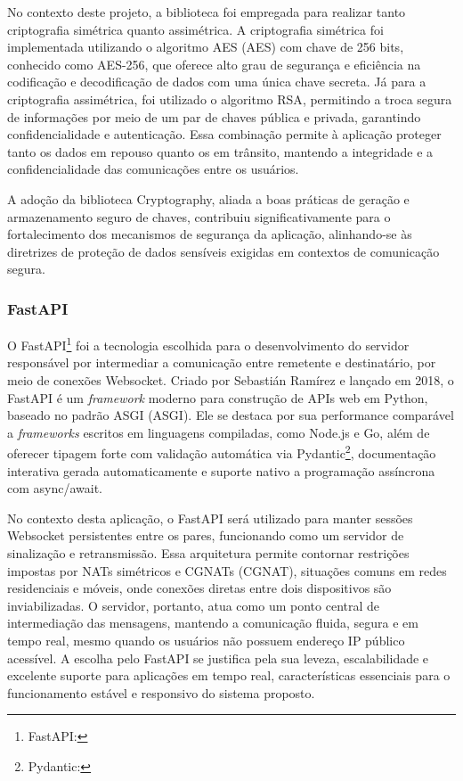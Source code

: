 No contexto deste projeto, a biblioteca foi empregada para realizar
tanto criptografia simétrica quanto assimétrica. A criptografia
simétrica foi implementada utilizando o algoritmo \acs{AES}
(\acl{AES}) com chave de 256 bits, conhecido como AES-256, que
oferece alto grau de segurança e eficiência na codificação e
decodificação de dados com uma única chave secreta. Já para a
criptografia assimétrica, foi utilizado o algoritmo \acs{RSA}, permitindo a
troca segura de informações por meio de um par de chaves pública e
privada, garantindo confidencialidade e autenticação. Essa combinação
permite à aplicação proteger tanto os dados em repouso quanto os em
trânsito, mantendo a integridade e a confidencialidade das
comunicações entre os usuários.

A adoção da biblioteca Cryptography, aliada a boas práticas de
geração e armazenamento seguro de chaves, contribuiu
significativamente para o fortalecimento dos mecanismos de segurança
da aplicação, alinhando-se às diretrizes de proteção de dados
sensíveis exigidas em contextos de comunicação segura.

\subsubsection{FastAPI}

O FastAPI\footnote{FastAPI: } foi
a tecnologia escolhida para o desenvolvimento do
servidor responsável por intermediar a comunicação entre remetente e
destinatário, por meio de conexões Websocket. Criado por Sebastián
Ramírez e lançado em 2018, o FastAPI é um \textit{framework} moderno para
construção de \acsp{API} web em Python, baseado no padrão \acs{ASGI}
(\acl{ASGI}). Ele se destaca por sua
performance comparável a \textit{frameworks} escritos em linguagens
compiladas, como Node.js e Go, além de oferecer tipagem forte com
validação automática via Pydantic\footnote{Pydantic:
}, documentação interativa gerada
automaticamente e suporte nativo a programação assíncrona com async/await.

No contexto desta aplicação, o FastAPI será utilizado para manter
sessões Websocket persistentes entre os pares, funcionando como um
servidor de sinalização e retransmissão. Essa arquitetura permite
contornar restrições impostas por \acsp{NAT} simétricos e \acsp{CGNAT}
(\acl{CGNAT}), situações comuns em redes residenciais e móveis,
onde conexões diretas entre dois dispositivos são inviabilizadas. O
servidor, portanto, atua como um ponto central de intermediação das
mensagens, mantendo a comunicação fluida, segura e em tempo real,
mesmo quando os usuários não possuem endereço \acs{IP} público
acessível. A escolha
pelo FastAPI se justifica pela sua leveza, escalabilidade e excelente
suporte para aplicações em tempo real, características essenciais
para o funcionamento estável e responsivo do sistema proposto.

